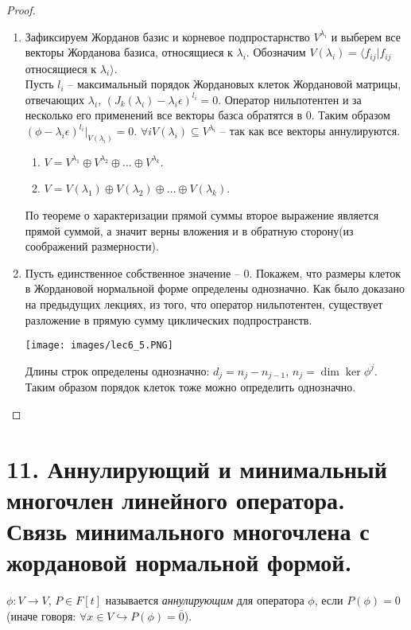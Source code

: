 \begin{proof}~
    \begin{enumerate}
        \item  Зафиксируем Жорданов базис и корневое подпростарнство $V^{\lambda_i}$ и выберем все векторы Жорданова базиса, относящиеся к $\lambda_i$. Обозначим $V(\lambda_i) = \langle f_{ij} | f_{ij}$ относящиеся к $\lambda_i \rangle$. \\
        Пусть $l_i$ -- максимальный порядок Жордановых клеток Жордановой матрицы, отвечающих $\lambda_i$, $(J_k(\lambda_i) - \lambda_i \epsilon)^{l_i} = 0$. 
        Оператор нильпотентен и за несколько его применений все векторы базса обратятся в 0.
        Таким образом $(\phi - \lambda_i \epsilon)^{l_i} \vert_{V(\lambda_i)} = 0$.
        $\forall i V(\lambda_i) \subseteq V^{\lambda_i}$ -- так как все векторы аннулируются.
        \begin{enumerate}
            \item $V = V^{\lambda_1} \oplus V^{\lambda_2} \oplus \dots \oplus V^{\lambda_k}$.
            \item $V = V(\lambda_1) \oplus V(\lambda_2) \oplus \dots \oplus V(\lambda_k)$.
        \end{enumerate}
        По теореме о характеризации прямой суммы второе выражение является прямой суммой, а значит верны вложения и в обратную сторону(из соображений размерности).
        \item Пусть единственное собственное значение -- 0. Покажем, что размеры клеток в Жордановой нормальной форме определены однозначно. 
        Как было доказано на предыдущих лекциях, из того, что оператор нильпотентен, существует разложение в прямую сумму циклических подпространств.
        \begin{center}
            \texttt{[image: images/lec6\_5.PNG]}
        \end{center}
        Длины строк определены однозначно: $d_j = n_j - n_{j-1}$, $n_j = \dim \ker \phi^j$. Таким образом порядок клеток тоже можно определить однозначно.
    \end{enumerate}
\end{proof}

\section{11. Аннулирующий и минимальный многочлен линейного оператора. Связь минимального многочлена с жордановой нормальной формой.}

\begin{definition}
    $\phi: V \to V$, $P \in F[t]$ называется \textit{аннулирующим} для оператора $\phi$, если $P(\phi) = 0$ (иначе говоря: $\forall x \in V \hookrightarrow P(\phi) = \overline{0}$).
\end{definition}

